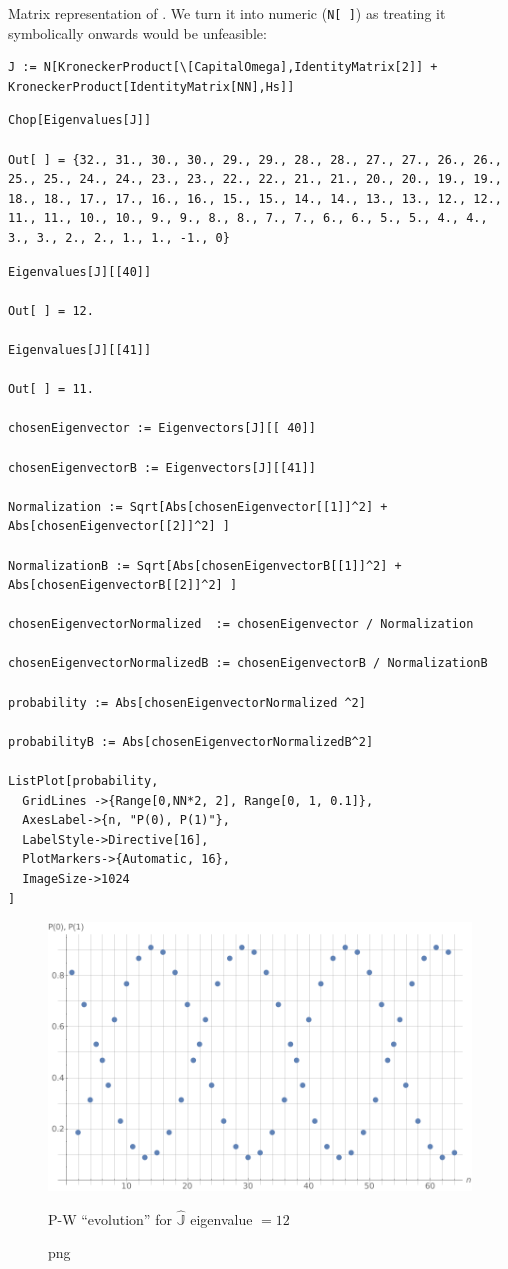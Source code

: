 Matrix representation of \cite[eq. 1]{Lloyd:Time}.
We turn it into numeric (\verb!N[ ]!) as treating  it symbolically onwards would be unfeasible:
\begin{Verbatim}
J := N[KroneckerProduct[\[CapitalOmega],IdentityMatrix[2]] + KroneckerProduct[IdentityMatrix[NN],Hs]]
\end{Verbatim}
\begin{Verbatim}
Chop[Eigenvalues[J]]

Out[ ] = {32., 31., 30., 30., 29., 29., 28., 28., 27., 27., 26., 26., 25., 25., 24., 24., 23., 23., 22., 22., 21., 21., 20., 20., 19., 19., 18., 18., 17., 17., 16., 16., 15., 15., 14., 14., 13., 13., 12., 12., 11., 11., 10., 10., 9., 9., 8., 8., 7., 7., 6., 6., 5., 5., 4., 4., 3., 3., 2., 2., 1., 1., -1., 0}
\end{Verbatim}
\begin{Verbatim}
Eigenvalues[J][[40]]

Out[ ] = 12.

Eigenvalues[J][[41]]

Out[ ] = 11.

chosenEigenvector := Eigenvectors[J][[ 40]]

chosenEigenvectorB := Eigenvectors[J][[41]]

Normalization := Sqrt[Abs[chosenEigenvector[[1]]^2] + Abs[chosenEigenvector[[2]]^2] ]

NormalizationB := Sqrt[Abs[chosenEigenvectorB[[1]]^2] + Abs[chosenEigenvectorB[[2]]^2] ]

chosenEigenvectorNormalized  := chosenEigenvector / Normalization

chosenEigenvectorNormalizedB := chosenEigenvectorB / NormalizationB

probability := Abs[chosenEigenvectorNormalized ^2]

probabilityB := Abs[chosenEigenvectorNormalizedB^2]

ListPlot[probability,
  GridLines ->{Range[0,NN*2, 2], Range[0, 1, 0.1]},
  AxesLabel->{n, "P(0), P(1)"},
  LabelStyle->Directive[16],
  PlotMarkers->{Automatic, 16},
  ImageSize->1024
]
\end{Verbatim}
\begin{figure}[!h]
  \centering
  \includegraphics[width=.75\textwidth]{img/N32.png}
  \caption[]{png}{P-W ``evolution'' for $\hat{\mathbb{J}}$ eigenvalue $=12$}
\end{figure}
